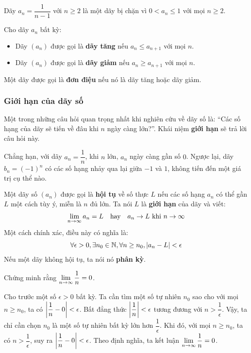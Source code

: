 \begin{example}
Dãy $a_n = \dfrac{1}{n-1}$ với $n \ge 2$ là một dãy bị chặn vì $0 < a_n \le 1$ với mọi $n \ge 2$.
\end{example}

\begin{definition} Cho dãy $a_n$ bất kỳ:
\begin{itemize}
    \item Dãy $(a_n)$ được gọi là \textbf{dãy tăng} nếu $a_n \le a_{n+1}$ với mọi $n$.
    \item Dãy $(a_n)$ được gọi là \textbf{dãy giảm} nếu $a_n \ge a_{n+1}$ với mọi $n$.
\end{itemize}
Một dãy được gọi là \textbf{đơn điệu} nếu nó là dãy tăng hoặc dãy giảm.
\end{definition}

\subsubsection{Giới hạn của dãy số}

Một trong những câu hỏi quan trọng nhất khi nghiên cứu về dãy số là: ``Các số hạng của dãy sẽ tiến về đâu khi $n$ ngày càng lớn?''. Khái niệm \textbf{giới hạn} sẽ trả lời câu hỏi này.

Chẳng hạn, với dãy $a_n = \dfrac{1}{n}$, khi $n$ lớn, $a_n$ ngày càng gần số $0$. Ngược lại, dãy $b_n = (-1)^n$ có các số hạng nhảy qua lại giữa $-1$ và $1$, không tiến đến một giá trị cụ thể nào.

\begin{definition}
Một dãy số $(a_n)$ được gọi là \textbf{hội tụ} về số thực $L$ nếu các số hạng $a_n$ có thể gần $L$ một cách tùy ý, miễn là $n$ đủ lớn. Ta nói $L$ là \textbf{giới hạn} của dãy và viết:
\[ \lim\limits_{n \to \infty} a_n = L \quad \text{hay} \quad a_n \to L \text{ khi } n \to \infty \]
Một cách chính xác, điều này có nghĩa là:
\[ \forall \epsilon > 0, \exists n_0 \in \mathbb{N}, \forall n \ge n_0, \left\lvert a_n - L \right\rvert < \epsilon \]
Nếu một dãy không hội tụ, ta nói nó \textbf{phân kỳ}.
\end{definition}

\begin{example}
    Chứng minh rằng $\lim\limits_{n \to \infty} \dfrac{1}{n} = 0$.
    
    \begin{solution}
    Cho trước một số $\epsilon > 0$ bất kỳ. Ta cần tìm một số tự nhiên $n_0$ sao cho với mọi $n \ge n_0$, ta có $\left\lvert \dfrac{1}{n} - 0 \right\rvert < \epsilon$.
    Bất đẳng thức $\left\lvert \dfrac{1}{n} \right\rvert < \epsilon$ tương đương với $n > \dfrac{1}{\epsilon}$.
    Vậy, ta chỉ cần chọn $n_0$ là một số tự nhiên bất kỳ lớn hơn $\dfrac{1}{\epsilon}$. Khi đó, với mọi $n \ge n_0$, ta có $n > \dfrac{1}{\epsilon}$, suy ra $\left\lvert \dfrac{1}{n} - 0 \right\rvert < \epsilon$.
    Theo định nghĩa, ta kết luận $\lim\limits_{n \to \infty} \dfrac{1}{n} = 0$.
    \end{solution}
\end{example}

